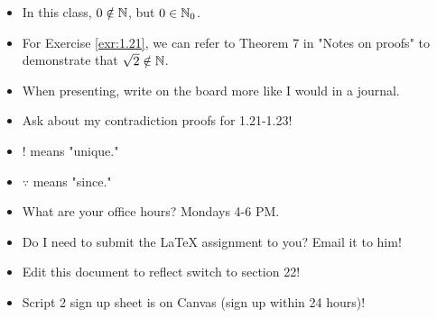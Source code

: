 \documentclass[titlepage]{article}
\begin{document}
\begin{itemize}
\begin{itemize}
    \end{itemize}
    \item In this class, $0\notin\mathbb{N}$, but $0\in\mathbb{N}_0$.
    \item For Exercise \ref{exr:1.21}, we can refer to Theorem 7 in "Notes on proofs" to demonstrate that $\sqrt{2}\notin\mathbb{N}$.
    \item When presenting, write on the board more like I would in a journal.
    \item Ask about my contradiction proofs for 1.21-1.23!
    \item {}! means "unique."
    \item $\because$ means "since."
    \item {}What are your office hours? Mondays 4-6 PM.
    \item Do I need to submit the LaTeX assignment to you? Email it to him!
    \item Edit this document to reflect switch to section 22!
    \item Script 2 sign up sheet is on Canvas (sign up within 24 hours)!
\end{itemize}
\newpage




\end{document}
